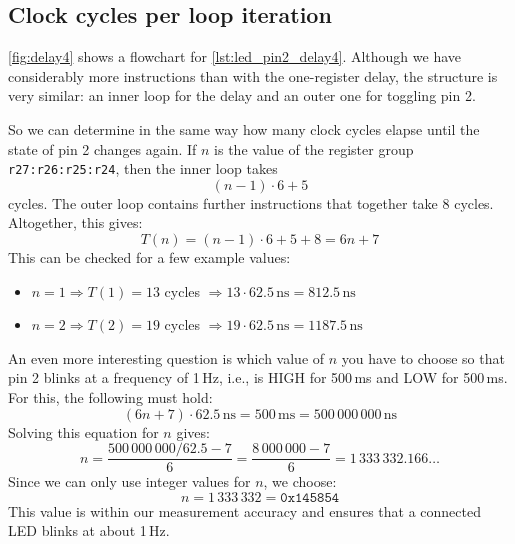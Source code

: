 \documentclass[a4paper,12pt]{article}
\begin{document}
\subsection{Clock cycles per loop iteration}
\label{sec:delay4cycles}

\autoref{fig:delay4} shows a flowchart for \autoref{lst:led_pin2_delay4}.
Although we have considerably more instructions than with the one-register
delay, the structure is very similar: an inner loop for the delay and an
outer one for toggling pin 2.

So we can determine in the same way how many clock cycles elapse until the
state of pin 2 changes again.
If \( n \) is the value of the register group \texttt{r27:r26:r25:r24},
then the inner loop takes
\[
    (n - 1) \cdot 6 + 5
\]
cycles. The outer loop contains further instructions that together take
8 cycles. Altogether, this gives:
\[
    T(n) = (n - 1) \cdot 6 + 5 + 8 = 6n + 7
\]
\newpage
\noindent
This can be checked for a few example values:
\begin{itemize}
    \item
	\( n = 1 \Rightarrow T(1) = 13 \) cycles
	\( \Rightarrow 13 \cdot 62.5\,\text{ns} = 812.5\,\text{ns} \)
    \item
	\( n = 2 \Rightarrow T(2) = 19 \) cycles
	\( \Rightarrow 19 \cdot 62.5\,\text{ns} = 1187.5\,\text{ns} \)
\end{itemize}
An even more interesting question is which value of \( n \) you have to
choose so that pin 2 blinks at a frequency of 1\,Hz, i.e., is HIGH for
500\,ms and LOW for 500\,ms. For this, the following must hold:
\[
    (6n + 7) \cdot 62.5\,\text{ns}
	= 500\,\text{ms} = 500\,000\,000\,\text{ns}
\]
Solving this equation for \( n \) gives:
\[
    n = \frac{500\,000\,000 / 62.5 - 7}{6}
	= \frac{8\,000\,000 - 7}{6} = 1\,333\,332.166\ldots
\]
Since we can only use integer values for \( n \), we choose:
\[
n = 1\,333\,332 = \texttt{0x145854}
\]
This value is within our measurement accuracy and ensures that a connected
LED blinks at about 1\,Hz.
\end{document}
